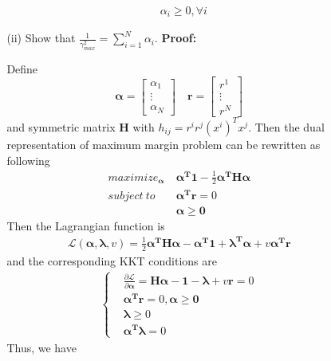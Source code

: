 \documentclass{article}
\renewcommand{\b}[1]{\bm{#1}}
\newcommand{\PARTIAL}[2]{\frac{\partial #1}{\partial #2}}
\begin{document}
\begin{enumerate}
\begin{enumerate}
\begin{enumerate}
\begin{align*}
                &\alpha_i\geq 0,\forall i
            \end{align*}
            \item [(ii)] Show that $\frac{1}{\gamma_{max}^2}=\sum_{i=1}^N\alpha_i$.\newline
            {\bf Proof:}
            \par Define 
            \[\b{\alpha}=\begin{bmatrix}
                \alpha_1\\
                \vdots\\
                \alpha_N
            \end{bmatrix}\quad
            \b{r} = \begin{bmatrix}
                r^1\\
                \vdots\\
                r^N
            \end{bmatrix} \]
            and symmetric matrix $\b{H}$ with $h_{ij}=r^ir^j(x^i)^Tx^j$.
            Then the dual representation of maximum margin problem can be rewritten as following
            \begin{align*}
                maximize_{\b{\alpha}}\ &\b{\alpha^T 1}-\frac{1}{2}\b{\alpha^T H \alpha}\\
                subject\ to\ &\b{\alpha^T r} = 0\\
                &\b{\alpha}\geq \b{0}
            \end{align*}
            Then the Lagrangian function is 
            \begin{align*}
                \mathcal{L}(\b{\alpha}, \b{\lambda}, v) = \frac{1}{2}\b{\alpha^TH\alpha}-\b{\alpha^T 1} + \b{\lambda^T \alpha} + v\b{\alpha^Tr}
            \end{align*}
            and the corresponding KKT conditions are
            \begin{align*}
                \left\{\begin{aligned}
                    &\PARTIAL{\mathcal{L}}{\b{\alpha}} = \b{H\alpha}-\b{1}-\b{\lambda}+v\b{r}=0\\
                    &\b{\alpha^T r} = 0, \b{\alpha}\geq \b{0}\\
                    &\b{\lambda} \geq 0\\
                    &\b{\alpha^T \lambda} = 0
                \end{aligned}\right.
            \end{align*}
            Thus, we have 
            \begin{align*}

\end{align*}
\end{enumerate}
\end{enumerate}
\end{enumerate}
\end{document}
